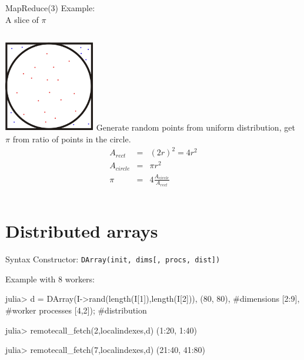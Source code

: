 \documentclass{beamer}
\begin{document}
	\begin{frame}{MapReduce(3)}
		Example: \\
		A slice of  $\pi$
		\begin{columns}[c]
			\includegraphics[height=4cm]{figures/square_circle.jpg}
			Generate random points from uniform distribution, get $\pi$ from ratio of points in the circle.
			\begin{equation*}
				\begin{array}{rcl}		
					A_{rect} & = & (2r)^2 = 4r^2 \\
					A_{circle} & = & \pi r^2 \\
					\pi & = & 4\frac{A_{circle}}{A_{rect}}
				\end{array}
			\end{equation*}
		\end{columns}
	\end{frame}

	\section{Distributed arrays}
	\begin{frame}[fragile]{Syntax}
    Constructor: \verb+DArray(init, dims[, procs, dist])+
		\begin{block}{Example with 8 workers:}
		\begin{semiverbatim}
		julia> d = DArray(I->rand(length(I[1]),length(I[2])),
											(80, 80),  #dimensions
											[2:9],     #worker processes
											[4,2]);	   #distribution
		
		julia> remotecall\_fetch(2,localindexes,d)
		(1:20, 1:40)
		
		julia> remotecall\_fetch(7,localindexes,d)
		(21:40, 41:80)
		\end{semiverbatim}
		\end{block}
	\end{frame}
\end{document}
